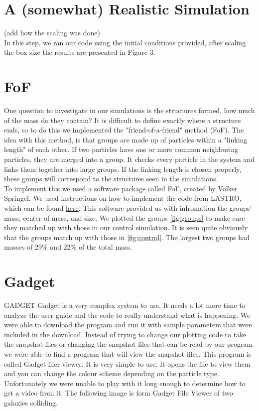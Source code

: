 \documentclass[10pt]{article}
\begin{document}
\section{A (somewhat) Realistic Simulation}
(add how the scaling was done)\\ 
	In this step, we ran our code using the initial conditions provided, after scaling the box size the results are presented in Figure 3.   

\section{FoF}
One question to investigate in our simulations is the structures formed, how much of the mass do they contain? It is difficult to define exactly where a structure ends, so to do this we implemented the "friend-of-a-friend" method (FoF). The idea with this method, is that groups are made up of particles within a "linking length" of each other. If two particles have one or more common neighboring particles, they are merged into a group. It checks every particle in the system and links them together into large groups. If the linking length is chosen properly, these groups will correspond to the structures seen in the simulations.\\
To implement this we used a software package called FoF, created by Volker Springel. We used instructions on how to implement the code from LASTRO, which can be found \href{http://obswww.unige.ch/lastro/misc/TP4/doc/rst/Exercices/Ex05.html#extracting-haloes}{here}. This software provided us with infromation the groups' mass, center of mass, and size. We plotted the groups \ref{fig:groups}{} to make sure they matched up with those in our control simulation. It is seen quite obviously that the groups match up with those in \ref{fig:control}. The largest two groups had masses of 29\% and 22\% of the total mass.

\section{Gadget}
GADGET
Gadget  is a very complex system to use. It needs a lot more time to analyze the user guide and the code to really understand what is happening. We were able to download the program and run it with sample parameters that were included in the download. Instead of trying to change our plotting code to take the snapshot files or changing the snapshot files that can be read by our program we were able to find a program that will view the snapshot files. This program is called Gadget filer viewer. It is very simple to use. It opens the file to view them and you can change the colour scheme depending on the particle type. Unfortunately we were unable to play with it long enough to determine how to get a video from it. The following image is form Gadget File Viewer of two galaxies colliding. 
\end{document}
